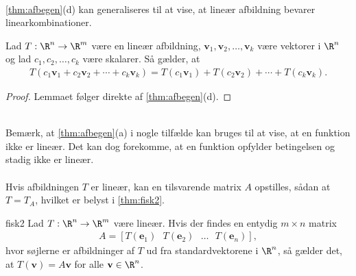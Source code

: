 %
\\
\ref{thm:afbegen}(d) kan generaliseres til at vise, at lineær afbildning bevarer linearkombinationer.
\begin{lem}{}{}
Lad $T:\R^n \rightarrow \R^m$ være en lineær afbildning, $\textbf{v}_1,\textbf{v}_2,\ldots,\textbf{v}_k$ være vektorer i $\R^n$ og lad $c_1,c_2,\ldots,c_k$ være skalarer. 
Så gælder, at
%
\begin{align*}
T(c_1\textbf{v}_1 + c_2\textbf{v}_2 + \cdots + c_k\textbf{v}_k) = T(c_1\textbf{v}_1) + T(c_2\textbf{v}_2) + \cdots + T(c_k\textbf{v}_k).
\end{align*}
%
\end{lem}
%
\begin{proof}
Lemmaet følger direkte af \ref{thm:afbegen}(d).
\end{proof}
\\
%
Bemærk, at \ref{thm:afbegen}(a) i nogle tilfælde kan bruges til at vise, at en funktion ikke er lineær. 
Det kan dog forekomme, at en funktion opfylder betingelsen og stadig ikke er lineær.
% 
\\\\
% 
Hvis afbildningen $T$ er lineær, kan en tilsvarende matrix $A$ opstilles, sådan at $T=T_A$, hvilket er belyst i \ref{thm:fisk2}.
%
% 
\begin{thm}{}{fisk2}
Lad $T: \R^n \rightarrow \R^m$ være lineær. 
Hvis der findes en entydig $m \times n$ matrix
\begin{align*}
A= [T(\mathbf{e}_1)\text{    } T(\mathbf{e}_2) \text{    } \ldots \text{    } T(\mathbf{e}_n)],
\end{align*}
hvor søjlerne er afbildninger af $T$ ud fra standardvektorene i $\R^n$, så gælder det, at $T(\mathbf{v})=A \mathbf{v}$ for alle $\mathbf{v} \in \R^n$.
\end{thm}
%
%
